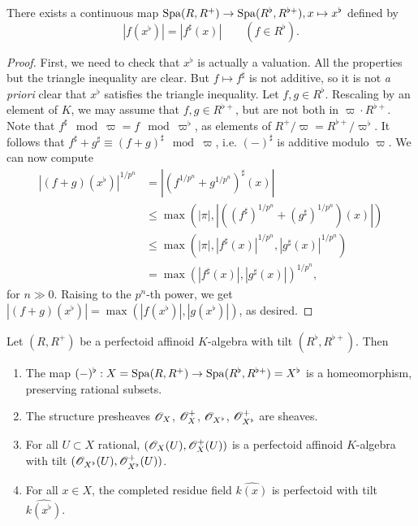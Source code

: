 \documentclass{article}
\begin{document}
\begin{proposition}
There exists a continuous map 
$\operatorname{Spa}(R,R^+) \to \operatorname{Spa}(R^\flat,R^{\flat +}), x\mapsto x^\flat$ defined by 
\[
  |f(x^\flat)| = |f^\sharp(x)| \qquad(f\in R^\flat) .
\]
\end{proposition}
\begin{proof}
First, we need to check that $x^\flat$ is actually a valuation. All the properties 
but the triangle inequality are clear. But $f\mapsto f^\sharp$ is not additive, so it 
is not \emph{a priori} clear that $x^\flat$ satisfies the triangle inequality. Let 
$f,g\in R^\flat$. Rescaling by an element of $K$, we may assume that 
$f,g\in R^{\flat +}$, but are not both in $\varpi\cdot R^{\flat +}$. Note that 
$f^\sharp\mod \varpi = f\mod\varpi^\flat$, as elements of 
$R^+/\varpi = R^{\flat+}/\varpi^\flat$. It follows that 
$f^\sharp+g^\sharp \equiv (f+g)^\sharp \mod\varpi$, i.e. $(-)^\sharp$ is additive 
modulo $\varpi$. We can now compute 
\begin{align*}
  |(f+g)(x^\flat)|^{1/p^n} &= |(f^{1/p^n}+g^{1/p^n})^\sharp(x)| \\
    &\leqslant \max(|\pi|, |((f^\sharp)^{1/p^n}+(g^\sharp)^{1/p^n})(x)|) \\
    &\leqslant \max(|\pi|, |f^\sharp(x)|^{1/p^n}, |g^\sharp(x)|^{1/p^n}) \\
    &= \max(|f^\sharp(x)|, |g^\sharp(x)|)^{1/p^n} ,
\end{align*}
for $n\gg 0$. Raising to the $p^n$-th power, we get 
$|(f+g)(x^\flat)| = \max(|f(x^\flat)|,|g(x^\flat)|)$, as desired. 
\end{proof}

\begin{theorem}
Let $(R,R^+)$ be a perfectoid affinoid $K$-algebra with tilt 
$(R^\flat,R^{\flat +})$. Then 
\begin{enumerate}
  \item The map $(-)^\flat:X=\operatorname{Spa}(R,R^+) \to \operatorname{Spa}(R^\flat,R^{\flat +})=X^\flat$ is a 
    homeomorphism, preserving rational subsets. 
  \item The structure presheaves $\mathscr{O}_X$, $\mathscr{O}_X^+$, $\mathscr{O}_{X^\flat}$, $\mathscr{O}_{X^\flat}^+$ are 
    sheaves. 
  \item For all $U\subset X$ rational, $(\mathscr{O}_X(U),\mathscr{O}_X^+(U))$ is a perfectoid 
    affinoid $K$-algebra with tilt $(\mathscr{O}_{X^\flat}(U), \mathscr{O}_{X^\flat}^+(U))$. 
  \item For all $x\in X$, the completed residue field $\widehat{k(x)}$ is 
    perfectoid with tilt $\widehat{k(x^\flat)}$. 
\end{enumerate}
\end{theorem}
\end{document}
